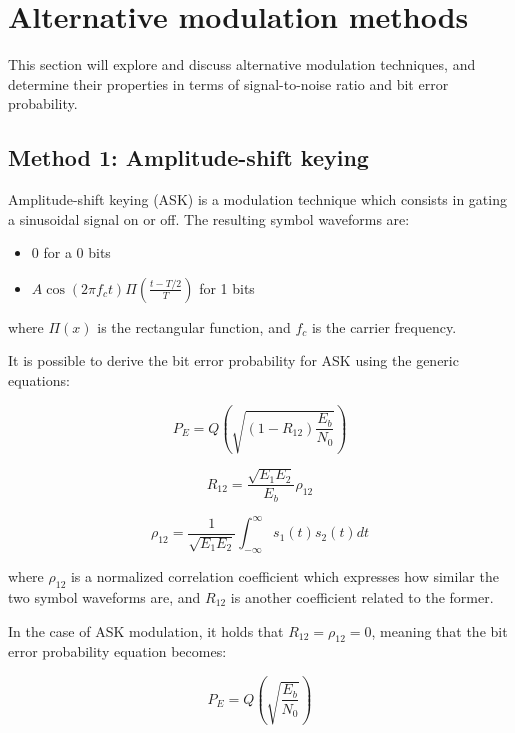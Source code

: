 \section{Alternative modulation methods}
This section will explore and discuss alternative modulation techniques, and determine their properties in terms of signal-to-noise ratio and bit error probability.


\subsection{Method 1: Amplitude-shift keying}
Amplitude-shift keying (ASK) is a modulation technique which consists in gating a sinusoidal signal on or off.
The resulting symbol waveforms are:

\begin{itemize}
	\item $0$ for a 0 bits
	\item $A\cos(2 \pi f_c t) \Pi(\frac{t-T/2}{T})$ for 1 bits
\end{itemize}

where $\Pi(x)$ is the rectangular function, and $f_c$ is the carrier frequency.

It is possible to derive the bit error probability for ASK using the generic equations:

\begin{equation}
	P_E = Q\left(\sqrt{\left(1 - R_{12}\right) \frac{E_b}{N_0}}\right)
\end{equation}

\begin{equation}
	R_{12} = \frac{\sqrt{E_1 E_2}}{E_b}\rho_{12}
\end{equation}

\begin{equation}
	\rho_{12} = \frac{1}{\sqrt{E_1 E_2}} \int_{-\infty}^{\infty} s_1(t) s_2(t) dt
\end{equation}

where $\rho_{12}$ is a normalized correlation coefficient which expresses how similar the two symbol waveforms are, and $R_{12}$ is another coefficient related to the former.

In the case of ASK modulation, it holds that $R_{12} = \rho_{12} = 0$, meaning that the bit error probability equation becomes:

\begin{equation}
	P_E = Q\left(\sqrt{\frac{E_b}{N_0}}\right)
\end{equation}

